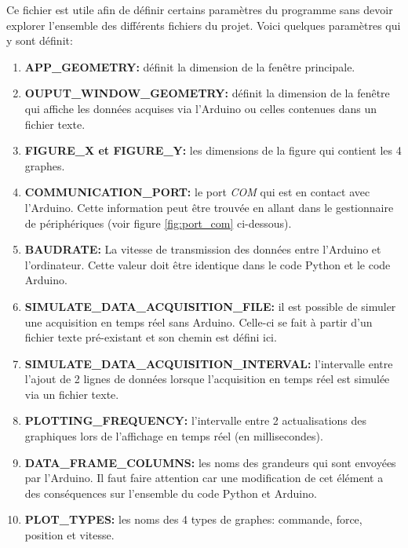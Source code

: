 Ce fichier est utile afin de définir certains paramètres du programme sans devoir explorer l'ensemble des différents fichiers du projet. Voici quelques paramètres qui y sont définit:
\begin{enumerate}
    \item \textbf{APP\_GEOMETRY:} définit la dimension de la fenêtre principale.
    
    \item \textbf{OUPUT\_WINDOW\_GEOMETRY:} définit la dimension de la fenêtre qui affiche les données acquises via l'Arduino ou celles contenues dans un fichier texte. 
    
    \item \textbf{FIGURE\_X et FIGURE\_Y:} les dimensions de la figure qui contient les 4 graphes.
    
    \item \textbf{COMMUNICATION\_PORT:} le port \textit{COM} qui est en contact avec l'Arduino. Cette information peut être trouvée en allant dans le gestionnaire de périphériques (voir figure \ref{fig:port_com} ci-dessous).
    
    \item \textbf{BAUDRATE:} La vitesse de transmission des données entre l'Arduino et l'ordinateur. Cette valeur doit être identique dans le code Python et le code Arduino.
    
    \item \textbf{SIMULATE\_DATA\_ACQUISITION\_FILE:} il est possible de simuler une acquisition en temps réel sans Arduino. Celle-ci se fait à partir d'un fichier texte pré-existant et son chemin est défini ici.
    
    \item \textbf{SIMULATE\_DATA\_ACQUISITION\_INTERVAL:} l'intervalle entre l'ajout de 2 lignes de données lorsque l'acquisition en temps réel est simulée via un fichier texte.
    
    \item \textbf{PLOTTING\_FREQUENCY:} l'intervalle entre 2 actualisations des graphiques lors de l'affichage en temps réel (en millisecondes).
    
    \item \textbf{DATA\_FRAME\_COLUMNS:} les noms des grandeurs qui sont envoyées par l'Arduino. Il faut faire attention car une modification de cet élément a des conséquences sur l'ensemble du code Python et Arduino.
    
    \item \textbf{PLOT\_TYPES:} les noms des 4 types de graphes: commande, force, position et vitesse.
\end{enumerate}

